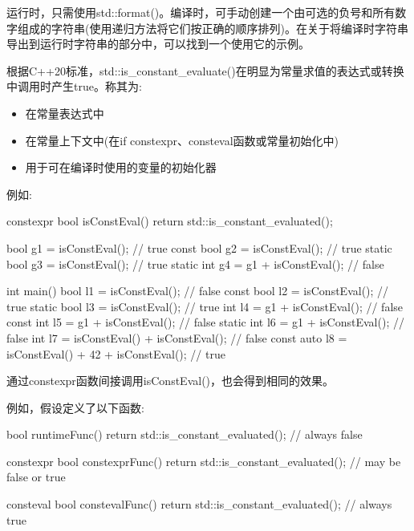 运行时，只需使用std::format()。编译时，可手动创建一个由可选的负号和所有数字组成的字符串(使用递归方法将它们按正确的顺序排列)。在关于将编译时字符串导出到运行时字符串的部分中，可以找到一个使用它的示例。



根据C++20标准，std::is\_constant\_evaluate()在明显为常量求值的表达式或转换中调用时产生true。称其为:

\begin{itemize}
\item 
在常量表达式中

\item 
在常量上下文中(在if constexpr、consteval函数或常量初始化中)

\item 
用于可在编译时使用的变量的初始化器
\end{itemize}

例如:

\begin{cpp}
constexpr bool isConstEval() {
	return std::is_constant_evaluated();
}

bool g1 = isConstEval(); // true
const bool g2 = isConstEval(); // true
static bool g3 = isConstEval(); // true
static int g4 = g1 + isConstEval(); // false

int main()
{
	bool l1 = isConstEval(); // false
	const bool l2 = isConstEval(); // true
	static bool l3 = isConstEval(); // true
	int l4 = g1 + isConstEval(); // false
	const int l5 = g1 + isConstEval(); // false
	static int l6 = g1 + isConstEval(); // false
	int l7 = isConstEval() + isConstEval(); // false
	const auto l8 = isConstEval() + 42 + isConstEval(); // true
}
\end{cpp}

通过constexpr函数间接调用isConstEval()，也会得到相同的效果。


例如，假设定义了以下函数:

\begin{cpp}
bool runtimeFunc() {
	return std::is_constant_evaluated(); // always false
}

constexpr bool constexprFunc() {
	return std::is_constant_evaluated(); // may be false or true
}

consteval bool constevalFunc() {
	return std::is_constant_evaluated(); // always true
}
\end{cpp}

